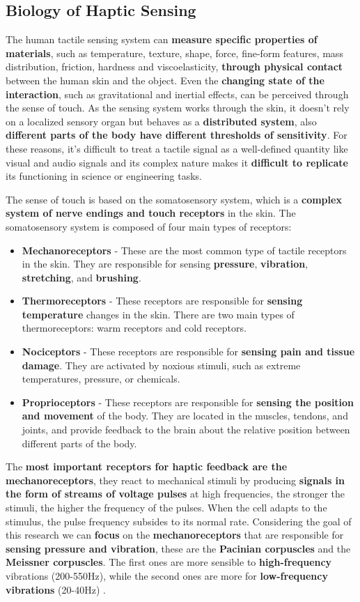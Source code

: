 \subsection{Biology of Haptic Sensing}
The human tactile sensing system can \textbf{measure specific properties of materials}, such as
temperature, texture, shape, force, fine-form features, mass distribution, friction, hardness
and viscoelasticity, \textbf{through physical contact} between the human skin and the object.
Even the \textbf{changing state of the interaction}, such as gravitational and inertial effects, can be perceived through the sense of touch. 
As the sensing system works through the skin, it doesn't rely on a localized sensory organ but behaves as a \textbf{distributed system}, also \textbf{different parts of the body have different thresholds of sensitivity}.
For these reasons, it's difficult to treat a tactile signal as a well-defined quantity like visual and audio signals and its complex nature makes it \textbf{difficult to replicate} its functioning in science or engineering tasks.

The sense of touch is based on the somatosensory system, which is a \textbf{ complex system of nerve endings and touch receptors} in the skin. The somatosensory system is composed of four main types of receptors:
\begin{itemize}
    \item \textbf{Mechanoreceptors} - These are the most common type of tactile receptors in the skin. They are responsible for sensing \textbf{pressure}, \textbf{vibration}, \textbf{stretching}, and \textbf{brushing}.
    \item \textbf{Thermoreceptors} - These receptors are responsible for \textbf{sensing temperature} changes in the skin. There are two main types of thermoreceptors: warm receptors and cold receptors.
    \item \textbf{Nociceptors} - These receptors are responsible for \textbf{sensing pain and tissue damage}. They are activated by noxious stimuli, such as extreme temperatures, pressure, or chemicals.
    \item \textbf{Proprioceptors} - These receptors are responsible for \textbf{sensing the position and movement} of the body. They are located in the muscles, tendons, and joints, and provide feedback to the brain about the relative position between different parts of the body.
\end{itemize}

The \textbf{most important receptors for haptic feedback are the mechanoreceptors}, they react to mechanical stimuli by producing \textbf{signals in the form of streams of voltage pulses} at high frequencies, the stronger the stimuli, the higher the frequency of the pulses. When the cell adapts to the stimulus, the pulse frequency subsides to its normal rate.
Considering the goal of this research we can \textbf{focus} on the \textbf{mechanoreceptors} that are responsible for \textbf{sensing pressure and vibration}, these are the \textbf{Pacinian corpuscles} and the \textbf{Meissner corpuscles}.
The first ones are more sensible to \textbf{high-frequency} vibrations (200-550Hz), while the second ones are more for \textbf{low-frequency vibrations} (20-40Hz) \cite{Alg_Wearable_Tech_Nicole}.